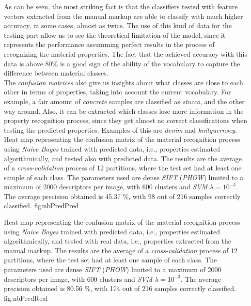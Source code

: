As can be seen, the most striking fact is that the classifiers tested with feature vectors extracted from the manual markup are able to classify with much higher accuracy, in some cases, almost as twice. The use of this kind of data for the testing part allow us to see the theoretical limitation of the model, since it represents the performance assumming perfect results in the process of recognizing the material properties. The fact that the achieved accuracy with this data is above 80\% is a good sign of the ability of the vocabulary to capture the difference between material classes. \\

The \emph{confusion matrices} also give us insights about what classes are close to each other in terms of properties, taking into account the current vocabulary. For example, a fair amount of \emph{concrete} samples are classified as \emph{stucco}, and the other way around. Also, it can be extracted which classes lose more information in the property recognition process, since they get almost no correct classifications when testing the predicted properties. Examples of this are \emph{denim} and \emph{knitguernsey}. \\

{Heat map representing the confusion matrix of the material recognition process using \emph{Naive Bayes} trained with predicted data, i.e., properties estimated algorithmically, and tested also with predicted data. The results are the average of a \emph{cross-validation} process of 12 partitions, where the test set had at least one sample of each class. The parameters used are dense \emph{SIFT} (\emph{PHOW}) limited to a maximum of 2000 descriptors per image, with 600 clusters and \emph{SVM} $\lambda=10^{-3}$. The average precision obtained is 45.37 \%, with 98 out of 216 samples correctly classified.}
{fig:nbPredPred}

{Heat map representing the confusion matrix of the material recognition process using \emph{Naive Bayes} trained with predicted data, i.e., properties estimated algorithmically, and tested with real data, i.e., properties extracted from the manual markup. The results are the average of a \emph{cross-validation} process of 12 partitions, where the test set had at least one sample of each class. The parameters used are dense \emph{SIFT} (\emph{PHOW}) limited to a maximum of 2000 descriptors per image, with 600 clusters and \emph{SVM} $\lambda=10^{-3}$. The average precision obtained is 80.56 \%, with 174 out of 216 samples correctly classified.}
{fig:nbPredReal}

